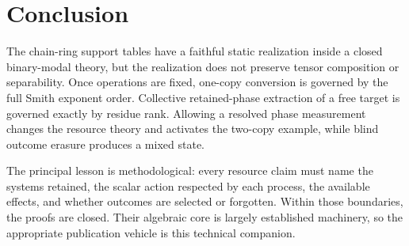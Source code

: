 \documentclass[11pt]{article}
\theoremstyle{definition}
\theoremstyle{remark}
\begin{document}
\section{Conclusion}

The chain-ring support tables have a faithful static realization inside a closed binary-modal theory, but the realization does not preserve tensor composition or separability. Once operations are fixed, one-copy conversion is governed by the full Smith exponent order. Collective retained-phase extraction of a free target is governed exactly by residue rank. Allowing a resolved phase measurement changes the resource theory and activates the two-copy example, while blind outcome erasure produces a mixed state.

The principal lesson is methodological: every resource claim must name the systems retained, the scalar action respected by each process, the available effects, and whether outcomes are selected or forgotten. Within those boundaries, the proofs are closed. Their algebraic core is largely established machinery, so the appropriate publication vehicle is this technical companion.

\small


\end{document}
